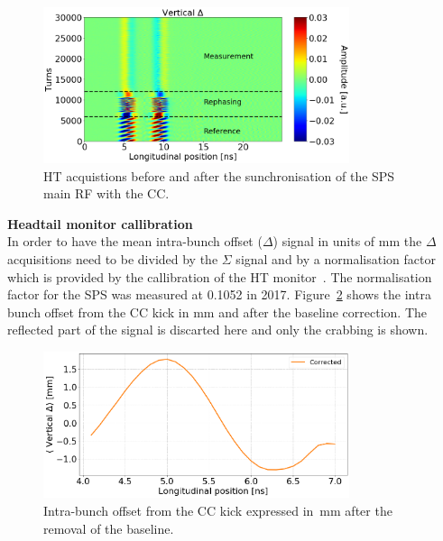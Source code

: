 \begin{figure}[!h]
   \centering         
   \includegraphics[width=0.8\textwidth]{images/Ch4/HT_measures_vs_reference_vs_corrected__20180530_135105_baseline_correction_onlyDelta.png}
       \caption{HT acquistions before and after the sunchronisation of the SPS main RF with the CC.}
       \label{fig:HT_baseline_correction_measurements_2D}
\end{figure}


\normalsize{\textbf{Headtail monitor callibration}}\\
In order to have the mean intra-bunch offset ($\Delta$) signal in units of mm the $\Delta$ acquisitions need to be divided by the $\Sigma$ signal and by a normalisation factor which is provided by the callibration of the HT monitor~\cite{PhysRevAccelBeams.22.112803}. The normalisation factor for the SPS was measured at 0.1052 in 2017. %
Figure~\ref{fig:HT_baseline_correction_crabbing_mm} shows the intra bunch offset from the CC kick in mm and after the baseline correction. The reflected part of the signal is discarted here and only the crabbing is shown. 


\begin{figure}[!h]
   \centering         
   \includegraphics[width=0.8\textwidth]{images/Ch4/HT_measures_vs_reference_vs_corrected__20180530_135105_baseline_correction_mm.png}
       \caption{Intra-bunch offset from the CC kick expressed in \,mm after the removal of the baseline.}
       \label{fig:HT_baseline_correction_crabbing_mm}
\end{figure}

